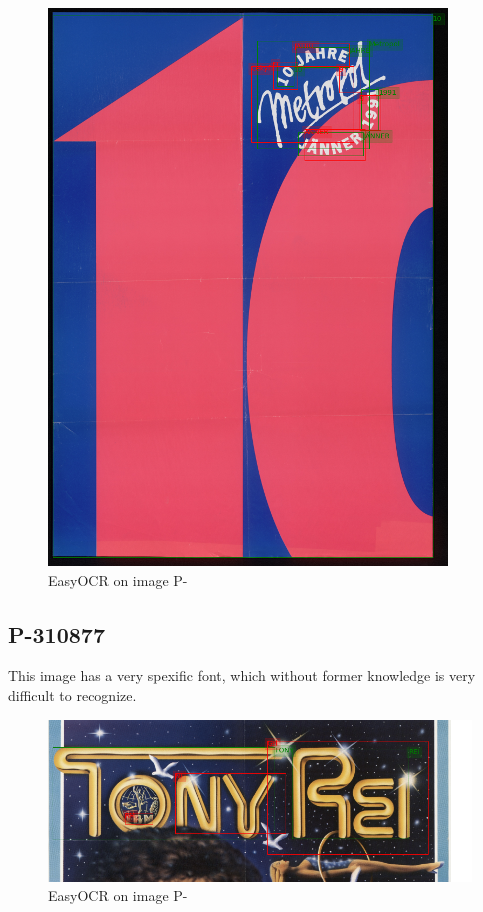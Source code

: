 \begin{figure}[hbtp!]
    \centering
    \includegraphics[scale=0.8]{obrazky/plakaty/result_easyOCR_vienna1_split_tuning_special_sensitive-55.png}
    \caption{EasyOCR on image P-}
    \label{Im5:ex:easy}
\end{figure}

\subsection*{P-310877}
This image has a very spexific font, which without former knowledge is very difficult to recognize.

\begin{figure}[hbtp!]
    \centering
    \includegraphics[width=\textwidth]{obrazky/plakaty/result_easyOCR_vienna2_nosplit_notuning_nocorrection-70.png}
    \caption{EasyOCR on image P-}
    \label{Im6:ex:easy}
\end{figure}


